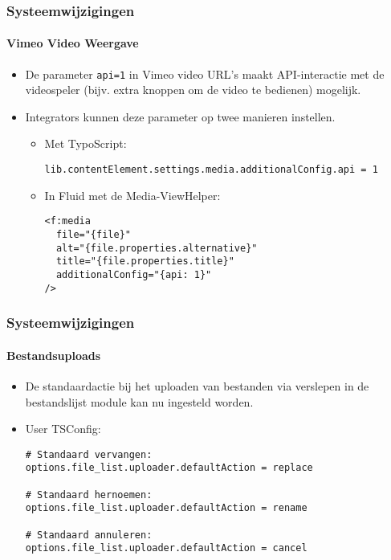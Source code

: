 \begin{frame}[fragile]
	\frametitle{Systeemwijzigingen}
	\framesubtitle{Vimeo Video Weergave}

	\lstset{basicstyle=\smaller\ttfamily}

	\begin{itemize}
		\item De parameter \texttt{api=1} in Vimeo video URL's maakt API-interactie met de videospeler
			(bijv. extra knoppen om de video te bedienen) mogelijk.
	\item Integrators kunnen deze parameter op twee manieren instellen.

		\begin{itemize}
			\item Met TypoScript:
\begin{lstlisting}
lib.contentElement.settings.media.additionalConfig.api = 1
\end{lstlisting}

			\item In Fluid met de Media-ViewHelper:
\begin{lstlisting}
<f:media
  file="{file}"
  alt="{file.properties.alternative}"
  title="{file.properties.title}"
  additionalConfig="{api: 1}"
/>
\end{lstlisting}

		\end{itemize}
	\end{itemize}

\end{frame}


\begin{frame}[fragile]
	\frametitle{Systeemwijzigingen}
	\framesubtitle{Bestandsuploads}

	\lstset{basicstyle=\smaller\ttfamily}

	\begin{itemize}
		\item De standaardactie bij het uploaden van bestanden via verslepen in de bestandslijst module kan nu ingesteld worden.
		\item User TSConfig:
\begin{lstlisting}
# Standaard vervangen:
options.file_list.uploader.defaultAction = replace

# Standaard hernoemen:
options.file_list.uploader.defaultAction = rename

# Standaard annuleren:
options.file_list.uploader.defaultAction = cancel
\end{lstlisting}

	\end{itemize}

\end{frame}

